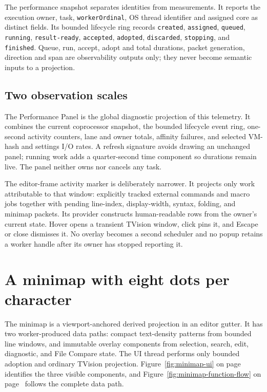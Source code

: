 \documentclass[a4paper,10pt,twoside,openany]{book}
\begin{document}
The performance snapshot separates identities from measurements. It reports
the execution owner, task, \texttt{workerOrdinal}, OS thread identifier and
assigned core as distinct fields. Its bounded lifecycle ring records
\texttt{created}, \texttt{assigned}, \texttt{queued}, \texttt{running},
\texttt{result-ready}, \texttt{accepted}, \texttt{adopted},
\texttt{discarded}, \texttt{stopping}, and \texttt{finished}. Queue, run,
accept, adopt and total durations, packet generation, direction and span are
observability outputs only; they never become semantic inputs to a projection.

\section{Two observation scales}

The Performance Panel is the global diagnostic projection of this telemetry.
It combines the current coprocessor snapshot, the bounded lifecycle event ring,
one-second activity counters, lane and owner totals, affinity failures, and
selected VM-hash and settings I/O rates. A refresh signature avoids drawing an
unchanged panel; running work adds a quarter-second time component so durations
remain live. The panel neither owns nor cancels any task.

The editor-frame activity marker is deliberately narrower. It projects only
work attributable to that window: explicitly tracked external commands and
macro jobs together with pending line-index, display-width, syntax, folding,
and minimap packets. Its provider constructs human-readable rows from the
owner's current state. Hover opens a transient TVision window, click pins it,
and Escape or close dismisses it. No overlay becomes a second scheduler and
no popup retains a worker handle after its owner has stopped reporting it.

\chapter{A minimap with eight dots per character}
\label{ch:minimap}

The minimap is a viewport-anchored derived projection in an editor gutter. It
has two worker-produced data paths: compact text-density patterns from bounded
line windows, and immutable overlay components from selection, search, edit,
diagnostic, and File Compare state. The UI thread performs only bounded
adoption and ordinary TVision projection. Figure~\ref{fig:minimap-ui} on
page~\pageref{fig:minimap-ui} identifies the three visible components, and
Figure~\ref{fig:minimap-function-flow} on
page~\pageref{fig:minimap-function-flow} follows the complete data path.
\end{document}
